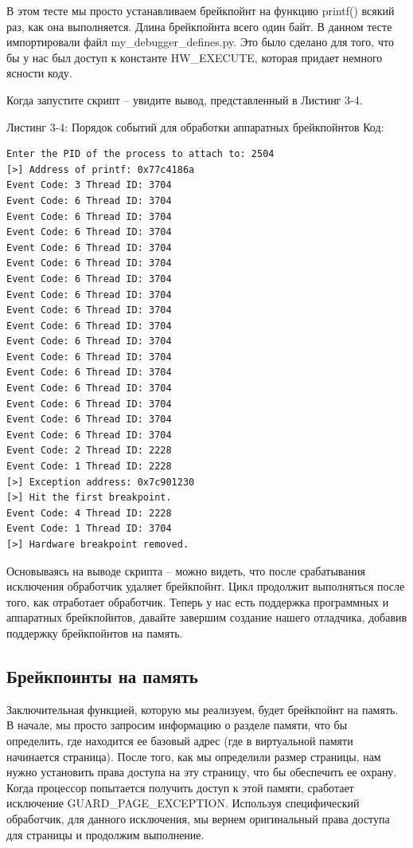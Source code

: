 \documentclass[12pt, a4paper, oneside]{book}
\begin{document}
В этом тесте мы просто устанавливаем брейкпойнт на функцию printf() всякий раз, как она выполняется. Длина брейкпойнта всего один байт. В данном тесте импортировали файл my\_debugger\_defines.py. Это было сделано для того, что бы у нас был доступ к константе HW\_EXECUTE, которая придает немного ясности коду.

Когда запустите скрипт – увидите вывод, представленный в Листинг 3-4.

Листинг 3-4: Порядок событий для обработки аппаратных брейкпойнтов
Код:
\begin{verbatim}
Enter the PID of the process to attach to: 2504
[>] Address of printf: 0x77c4186a
Event Code: 3 Thread ID: 3704
Event Code: 6 Thread ID: 3704
Event Code: 6 Thread ID: 3704
Event Code: 6 Thread ID: 3704
Event Code: 6 Thread ID: 3704
Event Code: 6 Thread ID: 3704
Event Code: 6 Thread ID: 3704
Event Code: 6 Thread ID: 3704
Event Code: 6 Thread ID: 3704
Event Code: 6 Thread ID: 3704
Event Code: 6 Thread ID: 3704
Event Code: 6 Thread ID: 3704
Event Code: 6 Thread ID: 3704
Event Code: 6 Thread ID: 3704
Event Code: 6 Thread ID: 3704
Event Code: 6 Thread ID: 3704
Event Code: 6 Thread ID: 3704
Event Code: 2 Thread ID: 2228
Event Code: 1 Thread ID: 2228
[>] Exception address: 0x7c901230
[>] Hit the first breakpoint.
Event Code: 4 Thread ID: 2228
Event Code: 1 Thread ID: 3704
[>] Hardware breakpoint removed.
\end{verbatim}

Основываясь на выводе скрипта – можно видеть, что после срабатывания исключения обработчик удаляет брейкпойнт. Цикл продолжит выполняться после того, как отработает обработчик. Теперь у нас есть поддержка программных и аппаратных брейкпойнтов, давайте завершим создание нашего отладчика, добавив поддержку брейкпойнтов на память.

\subsection{Брейкпоинты на память}

Заключительная функцией, которую мы реализуем, будет брейкпойнт на память. В начале, мы просто запросим информацию о разделе памяти, что бы определить, где находится ее базовый адрес (где в виртуальной памяти начинается страница). После того, как мы определили размер страницы, нам нужно установить права доступа на эту страницу, что бы обеспечить ее охрану. Когда процессор попытается получить доступ к этой памяти, сработает исключение GUARD\_PAGE\_EXCEPTION. Используя специфический обработчик, для данного исключения, мы вернем оригинальный права доступа для страницы и продолжим выполнение.
\end{document}

